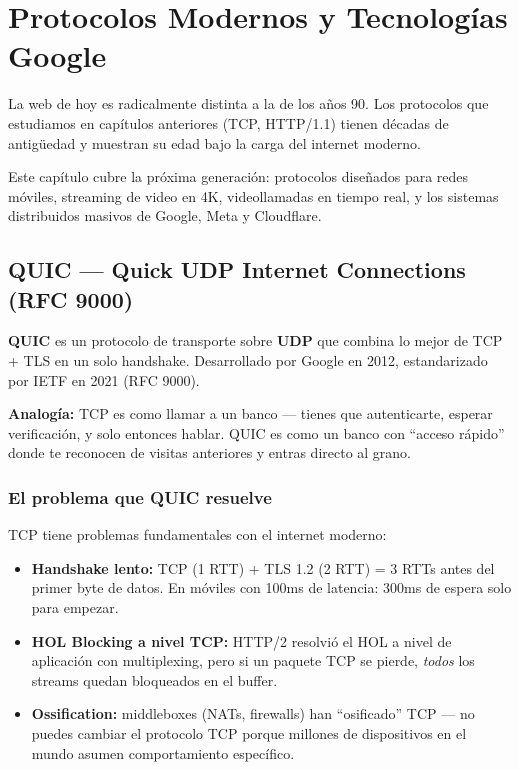 \chapter{ Protocolos Modernos y Tecnologías Google}

\begin{concepto}
La web de hoy es radicalmente distinta a la de los años 90. Los protocolos
que estudiamos en capítulos anteriores (TCP, HTTP/1.1) tienen décadas de
antigüedad y muestran su edad bajo la carga del internet moderno.

Este capítulo cubre la próxima generación: protocolos diseñados para
redes móviles, streaming de video en 4K, videollamadas en tiempo real,
y los sistemas distribuidos masivos de Google, Meta y Cloudflare.
\end{concepto}

\section{ QUIC --- Quick UDP Internet Connections (RFC 9000)}

\begin{concepto}
\textbf{QUIC} es un protocolo de transporte sobre \textbf{UDP} que combina
lo mejor de TCP + TLS en un solo handshake. Desarrollado por Google en 2012,
estandarizado por IETF en 2021 (RFC 9000).

 \textbf{Analogía:} TCP es como llamar a un banco
--- tienes que autenticarte, esperar verificación, y solo entonces
hablar. QUIC es como un banco con ``acceso rápido'' donde te reconocen
de visitas anteriores y entras directo al grano.
\end{concepto}

\subsection{El problema que QUIC resuelve}

TCP tiene problemas fundamentales con el internet moderno:

\begin{itemize}
    \item \textbf{Handshake lento:} TCP (1 RTT) + TLS 1.2 (2 RTT) = 3 RTTs antes
          del primer byte de datos. En móviles con 100ms de latencia: 300ms
          de espera solo para empezar.
    \item \textbf{HOL Blocking a nivel TCP:} HTTP/2 resolvió el HOL a nivel
          de aplicación con multiplexing, pero si un paquete TCP se pierde,
          \textit{todos} los streams quedan bloqueados en el buffer.
    \item \textbf{Ossification:} middleboxes (NATs, firewalls) han ``osificado''
          TCP --- no puedes cambiar el protocolo TCP porque millones de
          dispositivos en el mundo asumen comportamiento específico.
\end{itemize}


